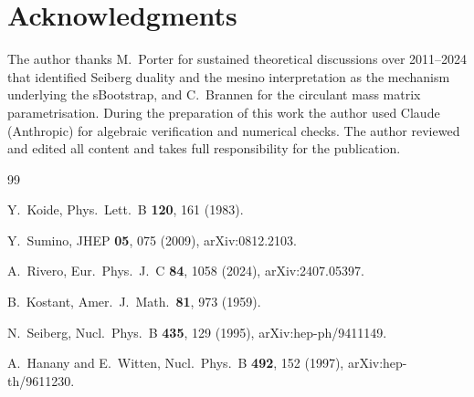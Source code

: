 \documentclass[final,3p,times,twocolumn]{elsarticle}
\begin{document}
\section*{Acknowledgments}

The author thanks M.~Porter for sustained theoretical discussions
over 2011--2024 that identified Seiberg duality and the mesino
interpretation as the mechanism underlying the sBootstrap,
and C.~Brannen for the circulant mass matrix parametrisation.
During the preparation of this work the author used Claude
(Anthropic) for algebraic verification and numerical checks.
The author reviewed and edited all content and takes full
responsibility for the publication.


\begin{thebibliography}{99}

  Y.~Koide,
  Phys.\ Lett.\ B \textbf{120}, 161 (1983).

  Y.~Sumino,
  JHEP \textbf{05}, 075 (2009),
  arXiv:0812.2103.

  A.~Rivero,
  Eur.\ Phys.\ J.\ C \textbf{84}, 1058 (2024),
  arXiv:2407.05397.

  B.~Kostant,
  Amer.\ J.\ Math.\ \textbf{81}, 973 (1959).

  N.~Seiberg,
  Nucl.\ Phys.\ B \textbf{435}, 129 (1995),
  arXiv:hep-ph/9411149.

  A.~Hanany and E.~Witten,
  Nucl.\ Phys.\ B \textbf{492}, 152 (1997),
  arXiv:hep-th/9611230.

\end{thebibliography}
\end{document}
